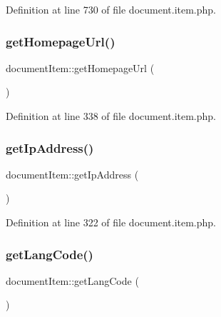 Definition at line 730 of file document.\+item.\+php.

\mbox{\label{classdocumentItem_ab9117599bb123e83289d2a24fd44bf50}} 
\subsubsection{\texorpdfstring{get\+Homepage\+Url()}{getHomepageUrl()}}
{\footnotesize\ttfamily document\+Item\+::get\+Homepage\+Url (\begin{DoxyParamCaption}{ }\end{DoxyParamCaption})}



Definition at line 338 of file document.\+item.\+php.

\mbox{\label{classdocumentItem_ac0e9b0006f067bc0918751148606d325}} 
\subsubsection{\texorpdfstring{get\+Ip\+Address()}{getIpAddress()}}
{\footnotesize\ttfamily document\+Item\+::get\+Ip\+Address (\begin{DoxyParamCaption}{ }\end{DoxyParamCaption})}



Definition at line 322 of file document.\+item.\+php.

\mbox{\label{classdocumentItem_a7491640a855ace286820cb11f273ddb6}} 
\subsubsection{\texorpdfstring{get\+Lang\+Code()}{getLangCode()}}
{\footnotesize\ttfamily document\+Item\+::get\+Lang\+Code (\begin{DoxyParamCaption}{ }\end{DoxyParamCaption})}



